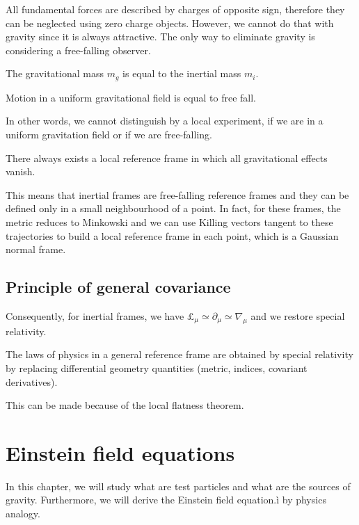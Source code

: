     All fundamental forces are described by charges of opposite sign, therefore they can be neglected using zero charge objects. However, we cannot do that with gravity since it is always attractive. The only way to eliminate gravity is considering a free-falling observer.
    \begin{princ}
        The gravitational mass $m_g$ is equal to the inertial mass $m_i$.
    \end{princ}
    \begin{princ}
        Motion in a uniform gravitational field is equal to free fall.
    \end{princ}
    In other words, we cannot distinguish by a local experiment, if we are in a uniform gravitation field or if we are free-falling.
    \begin{princ}
        There always exists a local reference frame in which all gravitational effects vanish.
    \end{princ}
    This means that inertial frames are free-falling reference frames and they can be defined only in a small neighbourhood of a point. In fact, for these frames, the metric reduces to Minkowski and we can use Killing vectors tangent to these trajectories to build a local reference frame in each point, which is a Gaussian normal frame. 

\section{Principle of general covariance}
    
    Consequently, for inertial frames, we have $\pounds_\mu \simeq \partial_\mu \simeq \nabla_\mu$ and we restore special relativity. 
    \begin{princ}
        The laws of physics in a general reference frame are obtained by special relativity by replacing differential geometry quantities (metric, indices, covariant derivatives).
    \end{princ}
    This can be made because of the local flatness theorem.

\chapter{Einstein field equations}

    In this chapter, we will study what are test particles and what are the sources of gravity. Furthermore, we will derive the Einstein field equation.ì by physics analogy.

